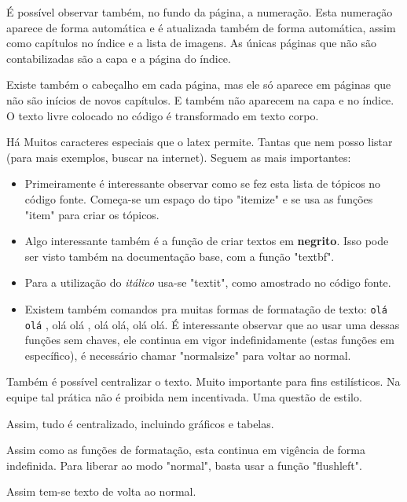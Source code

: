 \vspace{1cm}

É possível observar também, no fundo da página, a numeração. Esta numeração aparece de forma automática e é atualizada também de forma automática, assim como capítulos no índice e a lista de imagens. As únicas páginas que não são contabilizadas são a capa e a página do índice.

Existe também o cabeçalho em cada página, mas ele só aparece em páginas que não são inícios de novos capítulos. E também não aparecem na capa e no índice. O texto livre colocado no código é transformado em texto corpo.

Há Muitos caracteres especiais que o latex permite. Tantas que nem posso listar (para mais exemplos, buscar na internet). Seguem as mais importantes:

\begin{itemize}
	\item Primeiramente é interessante observar como se fez esta lista de tópicos no código fonte. Começa-se um espaço do tipo "itemize" e se usa as funções "item" para criar os tópicos. 
	\item Algo interessante também é a função de criar textos em \textbf{negrito}. Isso pode ser visto também na documentação base, com a função "textbf".
	\item Para a utilização do  \textit{itálico} usa-se "textit", como amostrado no código fonte.
	\item Existem também comandos pra muitas formas de formatação de texto: \texttt{olá olá} , \LARGE olá olá , \normalsize olá olá, \scriptsize olá olá. \normalsize É interessante observar que ao usar uma dessas funções sem chaves, ele continua em vigor indefinidamente (estas funções em específico), é necessário chamar "normalsize" para voltar ao normal. 
\end{itemize}

\centering 
Também é possível centralizar o texto. Muito importante para fins estilísticos. Na equipe tal prática não é proibida nem incentivada. Uma questão de estilo.

Assim, tudo é centralizado, incluindo gráficos e tabelas.

Assim como as funções de formatação, esta continua em vigência de forma indefinida. Para liberar ao modo "normal", basta usar a função "flushleft".

\flushleft

Assim tem-se texto de volta ao normal.

\flushright 

